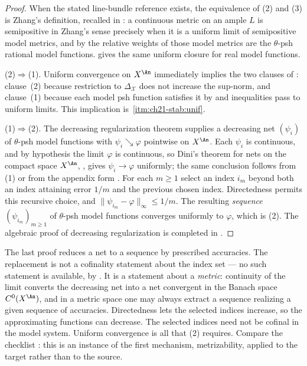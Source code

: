 \begin{proof}
When the stated line-bundle reference exists, the equivalence of
(2) and (3) is Zhang's definition, recalled in
: a continuous metric on an ample $L$ is
semipositive in Zhang's sense precisely when it is a uniform limit of
semipositive model metrics, and by
 the relative weights of those model
metrics are the $\theta$-psh rational model functions.
 gives the same uniform
closure for real model functions.

(2)$\Rightarrow$(1).  Uniform convergence on $X^{\An}$
immediately implies the two clauses of : clause~(2)
because restriction to $\Delta_{\mathcal X}$ does not increase the
sup-norm, and clause~(1) because each model psh function satisfies it by
 and inequalities pass to uniform
limits.  This implication is
\,\cref{itm:ch21-stab:unif}.

(1)$\Rightarrow$(2).  The decreasing regularization theorem
 supplies a decreasing net
$(\psi_i)$ of $\theta$-psh model functions with
$\psi_i\searrow\varphi$ pointwise on $X^{\An}$.  Each $\psi_i$ is
continuous, and by hypothesis the limit $\varphi$ is continuous, so
Dini's theorem for nets on the compact space
$X^{\An}$, , gives $\psi_i\to\varphi$ uniformly;
the same conclusion follows from \,(1) or from the
appendix form .  For each $m\geq1$ select an index
$i_m$ beyond both an index attaining error $1/m$ and the previous
chosen index.  Directedness permits this recursive choice, and
$\lVert\psi_{i_m}-\varphi\rVert_\infty\leq1/m$.  The
resulting \emph{sequence} $(\psi_{i_m})_{m\geq1}$ of $\theta$-psh model
functions converges uniformly to $\varphi$, which is (2).  The algebraic
proof of decreasing regularization is completed in
.
\end{proof}

\begin{remark}
\label{rem:ch21-net-to-sequence}
The last proof reduces a net to a sequence by prescribed accuracies.
The replacement is not a cofinality statement about the index set --- no
such statement is available, by .  It is
a statement about a \emph{metric}: continuity of the limit converts the
decreasing net into a net convergent in the Banach space
$C^0(X^{\An})$, and in a metric space one may always extract a sequence
realizing a given sequence of accuracies.  Directedness lets the
selected indices increase, so the approximating functions can decrease.
The selected indices need not be cofinal in the model system.  Uniform
convergence is all that (2) requires.  Compare the
checklist : this is an instance of the
first mechanism, metrizability, applied to the target rather than to the
source.
\end{remark}

